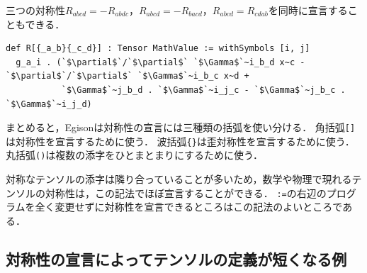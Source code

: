 三つの対称性$R_{abcd} = -R_{abdc}$，$R_{abcd} = -R_{bacd}$，$R_{abcd} = R_{cdab}$を同時に宣言することもできる．
\begin{lstlisting}[language=egison,numbers=none]
def R[{_a_b}{_c_d}] : Tensor MathValue := withSymbols [i, j]
  g_a_i . (`$\partial$`/`$\partial$` `$\Gamma$`~i_b_d x~c - `$\partial$`/`$\partial$` `$\Gamma$`~i_b_c x~d +
           `$\Gamma$`~j_b_d . `$\Gamma$`~i_j_c - `$\Gamma$`~j_b_c . `$\Gamma$`~i_j_d)
\end{lstlisting}

まとめると，Egisonは対称性の宣言には三種類の括弧を使い分ける．
角括弧\lstinline|[]|は対称性を宣言するために使う．
波括弧\lstinline|{}|は歪対称性を宣言するために使う．
丸括弧\lstinline|()|は複数の添字をひとまとまりにするために使う．

対称なテンソルの添字は隣り合っていることが多いため，数学や物理で現れるテンソルの対称性は，この記法でほぼ宣言することができる．
\lstinline{:=}の右辺のプログラムを全く変更せずに対称性を宣言できるところはこの記法のよいところである．


\subsection{対称性の宣言によってテンソルの定義が短くなる例}

